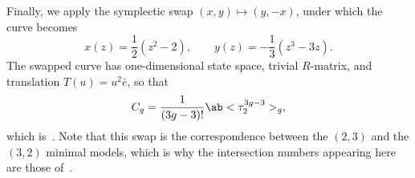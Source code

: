 \documentclass{amsart}
\theoremstyle{definition}
\theoremstyle{remark}
\theoremstyle{plain}
\theoremstyle{definition}
\theoremstyle{remark}
\newcommand{\1}{\mathbf{1}}
\newcommand{\2}{\mathbf{2}}
\newcommand{\3}{\mathbf{3}}
\begin{document}
Finally, we apply the symplectic swap \((x,y) \mapsto (y,-x)\), under which the curve becomes
\[ x(z) = \frac{1}{2}(z^2-2), \qquad y(z) = -\frac{1}{3}(z^3-3z). \]
The swapped curve has one-dimensional state space, trivial \(R\)-matrix, and translation \(T(u) = u^2 \bar{e}\), so that
\[ C_g = \frac{1}{(3g-3)!}\ab<\tau_2^{3g-3}>_g, \]
which is~. Note that this swap is the correspondence between the \((2,3)\) and the \((3,2)\) minimal models, which is why the intersection numbers appearing here are those of~.

\printbibliography
\end{document}
